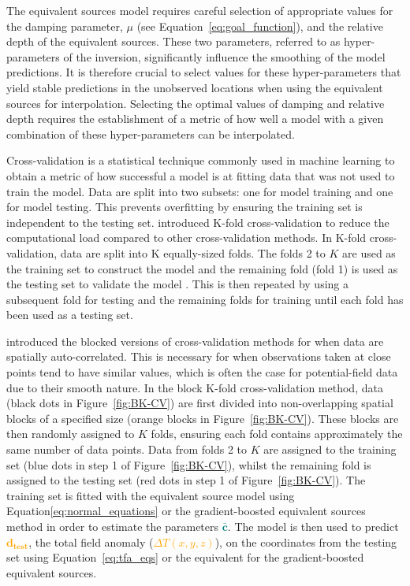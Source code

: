 The equivalent sources model requires careful selection of appropriate values for the damping parameter, $\mu$ (see Equation~\ref{eq:goal_function}), and the relative depth of the equivalent sources. These two parameters, referred to as hyper-parameters of the inversion, significantly influence the smoothing of the model predictions. It is therefore crucial to select values for these hyper-parameters that yield stable predictions in the unobserved locations when using the equivalent sources for interpolation. Selecting the optimal values of damping and relative depth requires the establishment of a metric of how well a model with a given combination of these hyper-parameters can be interpolated.

Cross-validation is a statistical technique commonly used in machine learning to obtain a metric of how successful a model is at fitting data that was not used to train the model. Data are split into two subsets: one for model training and one for model testing. This prevents overfitting by ensuring the training set is independent to the testing set. \citet{Geisser1975} introduced K-fold cross-validation to reduce the computational load compared to other cross-validation methods. In K-fold cross-validation, data are split into K equally-sized folds. The folds 2 to $K$ are used as the training set to construct the model and the remaining fold (fold 1) is used as the testing set to validate the model \citep{Jung2017}. This is then repeated by using a subsequent fold for testing and the remaining folds for training until each fold has been used as a testing set.

\citet{Roberts2017} introduced the blocked versions of cross-validation methods for when data are spatially auto-correlated. This is necessary for when observations taken at close points tend to have similar values, which is often the case for potential-field data due to their smooth nature. In the block K-fold cross-validation method, data (black dots in Figure~\ref{fig:BK-CV}) are first divided into non-overlapping spatial blocks of a specified size (orange blocks in Figure~\ref{fig:BK-CV}). These blocks are then randomly assigned to $K$ folds, ensuring each fold contains approximately the same number of data points. Data from folds 2 to $K$ are assigned to the training set (blue dots in step 1 of Figure~\ref{fig:BK-CV}), whilst the remaining fold is assigned to the testing set (red dots in step 1 of Figure~\ref{fig:BK-CV}). The training set is fitted with the equivalent source model using Equation\ref{eq:normal_equations} or the gradient-boosted equivalent sources method in order to estimate the parameters \textcolor{teal}{$\bar{\mathbf{c}}$}. The model is then used to predict \textcolor{orange}{$\mathbf{d_{test}}$}, the total field anomaly (\textcolor{orange}{$\Delta T (x, y, z)$}), on the coordinates from the testing set using Equation~\ref{eq:tfa_eqs} or the equivalent for the gradient-boosted equivalent sources.

